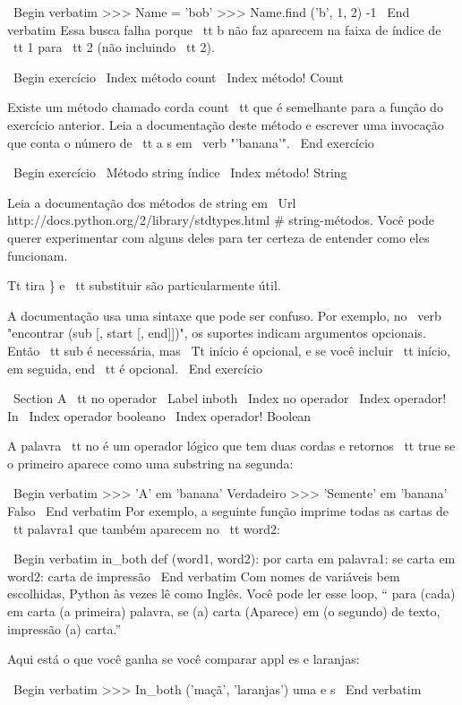 \documentclass[10pt]{book}
\begin{document}
{{{{{\ Begin {verbatim}
>>> Name = 'bob'
>>> Name.find ('b', 1, 2)
-1
\ End {verbatim}
%
Essa busca falha porque {\ tt b} não faz
aparecem na faixa de índice de {\ tt 1} para {\ tt 2} (não incluindo {\ tt
2}).


\ Begin {} exercício
\ Index {método count}
\ Index {método! Count}

Existe um método chamado corda {count \ tt} que é semelhante
para a função do exercício anterior. Leia a documentação
deste método
e escrever uma invocação que conta o número de {\ tt a} s
em \ verb "'banana'".
\ End {} exercício


\ Begin {} exercício
\ {Método string} índice
\ Index {método! String}

Leia a documentação dos métodos de string em
\ Url {http://docs.python.org/2/library/stdtypes.html # string-métodos}.
Você pode querer experimentar com alguns deles para ter certeza de
entender como eles funcionam. {Tt tira \} e {\ tt substituir} são
particularmente útil.

A documentação usa uma sintaxe que pode ser confuso.
Por exemplo, no \ verb "encontrar (sub [, start [, end]])", os suportes
indicam argumentos opcionais. Então {\ tt sub} é necessária, mas
{\ Tt início} é opcional, e se você incluir {\ tt início},
em seguida, {end \ tt} é opcional.
\ End {} exercício


\ Section {A {\ tt no}} operador
\ Label {} inboth
\ Index {} no operador
\ Index {operador! In}
\ Index {operador booleano}
\ Index {operador! Boolean}

A palavra {\ tt no} é um operador lógico que tem duas cordas e
retornos {\ tt true} se o primeiro aparece como uma substring na segunda:

\ Begin {verbatim}
>>> 'A' em 'banana'
Verdadeiro
>>> 'Semente' em 'banana'
Falso
\ End {verbatim}
%
Por exemplo, a seguinte função imprime todas as
cartas de {\ tt palavra1} que também aparecem no {\ tt word2}:

\ Begin {verbatim}
in_both def (word1, word2):
    por carta em palavra1:
        se carta em word2:
            carta de impressão
\ End {verbatim}
%
Com nomes de variáveis ​​bem escolhidas,
Python às vezes lê como Inglês. Você pode ler
esse loop, `` para (cada) em carta (a primeira) palavra, se (a) carta 
(Aparece) em (o segundo) de texto, impressão (a) carta.''

Aqui está o que você ganha se você comparar appl es e laranjas:

\ Begin {verbatim}
>>> In_both ('maçã', 'laranjas')
uma
e
s
\ End {verbatim}
%

}}}}}}
\end{document}
